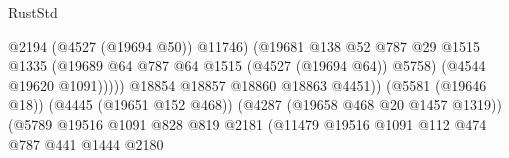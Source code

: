 \begin{lexlean}{RustStd}
\begin{coremodule}
{\begin{coremodule}
{{{{{{{{{{{{{{{{{{{{{{{{{{{{{{{{{{{{{{                                                            @2194
                                                            (@4527 (@19694 @50))
                                                            @11746)
                                                          (@19681
                                                            @138
                                                            @52
                                                            @787
                                                            @29
                                                            @1515
                                                            @1335
                                                            (@19689
                                                              @64
                                                              @787
                                                              @64
                                                              @1515
                                                              (@4527 (@19694 @64))
                                                              @5758)
                                                            (@4544 @19620 @1091)))))
                                                    @18854
                                                    @18857
                                                    @18860
                                                    @18863
                                                    @4451))
                                                (@5581 (@19646 @18))
                                                (@4445 (@19651 @152 @468))
                                                (@4287 (@19658 @468 @20 @1457 @1319))
                                                (@5789
                                                  @19516
                                                  @1091
                                                  @828
                                                  @819
                                                  @2181
                                                  (@11479
                                                    @19516
                                                    @1091
                                                    @112
                                                    @474
                                                    @787
                                                    @441
                                                    @1444
                                                    @2180
}}}}}}}}}}}}}}}}}}}}}}}}}}}}}}}}}}}}}}
\end{coremodule}}
\end{coremodule}
\end{lexlean}
